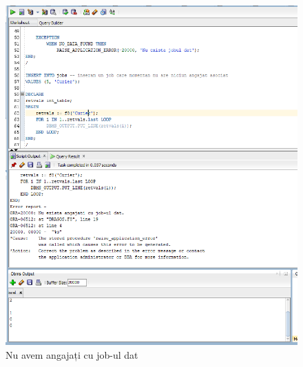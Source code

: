 \documentclass[12pt]{article}
\begin{document}
\begin{figure}[!htb]
\includegraphics[max width=\linewidth]{imgs/ex8_3.png}
\caption{Nu avem angajați cu job-ul dat}
\label{fig:ex8_3}
\end{figure}
\end{document}
